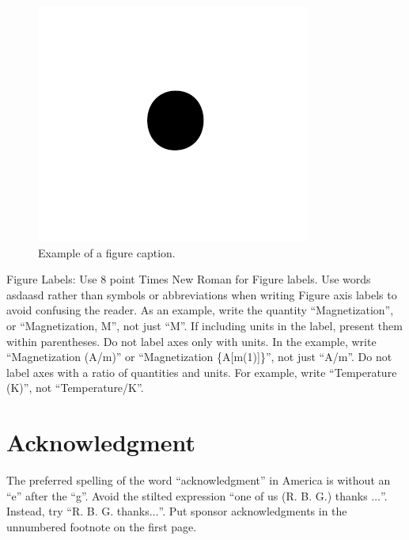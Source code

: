 \documentclass[conference]{IEEEtran}
\begin{document}
\begin{figure}[htbp]
\centerline{\includegraphics{fig1.png}}
\caption{Example of a figure caption.}
\label{fig}
\end{figure}

Figure Labels: Use 8 point Times New Roman for Figure labels. Use words 
\autocite{pratt2015cambrian} asdaasd 
rather than symbols or abbreviations when writing Figure axis labels to 
avoid confusing the reader. As an example, write the quantity 
``Magnetization'', or ``Magnetization, M'', not just ``M''. If including 
units in the label, present them within parentheses. Do not label axes only 
with units. In the example, write ``Magnetization (A/m)'' or ``Magnetization 
\{A[m(1)]\}'', not just ``A/m''. Do not label axes with a ratio of 
quantities and units. For example, write ``Temperature (K)'', not 
``Temperature/K''.

\section*{Acknowledgment}

The preferred spelling of the word ``acknowledgment'' in America is without 
an ``e'' after the ``g''. Avoid the stilted expression ``one of us (R. B. 
G.) thanks $\ldots$''. Instead, try ``R. B. G. thanks$\ldots$''. Put sponsor 
acknowledgments in the unnumbered footnote on the first page.

\newpage{}
\printbibliography{}
\end{document}
